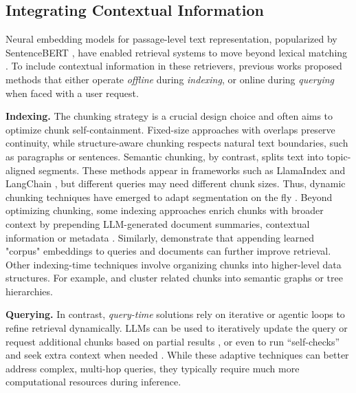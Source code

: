 \subsection{Integrating Contextual Information} \label{related_work_contextual}
Neural embedding models for passage-level text representation, popularized by SentenceBERT , have enabled retrieval systems to move beyond lexical matching . To include contextual information in these retrievers, previous works proposed methods that either operate \textit{offline} during \emph{indexing}, or online during \emph{querying} when faced with a user request.

\noindent\textbf{Indexing.} The chunking strategy is a crucial design choice and often aims to optimize chunk self-containment. Fixed-size approaches with overlaps preserve continuity, while structure-aware chunking respects natural text boundaries, such as paragraphs or sentences. Semantic chunking, by contrast, splits text into topic-aligned segments. These methods appear in frameworks such as LlamaIndex  and LangChain , but different queries may need different chunk sizes. Thus, dynamic chunking techniques have emerged to adapt segmentation on the fly . Beyond optimizing chunking, some indexing approaches enrich chunks with broader context by prepending LLM-generated document summaries, contextual information or metadata . Similarly,  demonstrate that appending learned "corpus" embeddings to queries and documents can further improve retrieval. Other indexing-time techniques involve organizing chunks into higher-level data structures. For example,  and  cluster related chunks into semantic graphs or tree hierarchies.


\noindent\textbf{Querying.} In contrast, \emph{query-time} solutions rely on iterative or agentic loops to refine retrieval dynamically. LLMs can be used to iteratively update the query or request additional chunks based on partial results , or even to run “self-checks” and seek extra context when needed . While these adaptive techniques can better address complex, multi-hop queries, they typically require much more computational resources during inference.


